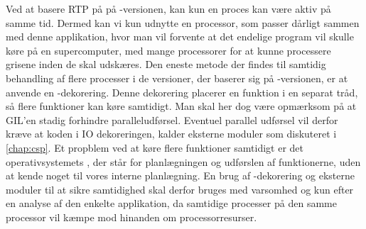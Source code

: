 Ved at basere RTP på  på -versionen, kan kun en proces  kan være aktiv på samme tid. Dermed kan vi kun udnytte en processor, som  passer dårligt sammen med denne applikation, hvor man vil forvente at det endelige program vil skulle køre på en supercomputer, med mange processorer for at kunne processere grisene inden de skal udskæres.  Den eneste metode der findes til samtidig behandling af flere processer i  de versioner, der baserer sig på -versionen, er at anvende en -dekorering. Denne dekorering placerer en funktion i en separat tråd, så flere funktioner kan køre samtidigt. Man skal her dog være opmærksom på at GIL'en stadig forhindre paralleludførsel. Eventuel parallel udførsel vil derfor kræve at koden i IO dekoreringen, kalder eksterne moduler som diskuteret i \cref{chap:csp}. Et propblem ved at køre flere funktioner samtidigt er det operativsystemets \sched, der står for planlægningen og udførslen af funktionerne, uden at kende noget til vores interne planlægning. En brug af -dekorering og eksterne moduler til at sikre samtidighed skal derfor bruges med varsomhed og kun efter en analyse af den enkelte applikation, da samtidige processer på den samme processor vil kæmpe mod hinanden om processorresurser.


 
